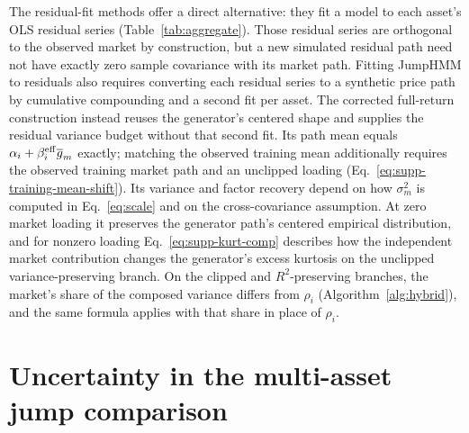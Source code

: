 The residual-fit methods offer a direct alternative: they fit a model
to each asset's OLS residual series (Table~\ref{tab:aggregate}). Those
residual series are orthogonal to the observed market by
construction, but a new simulated residual path need not have exactly
zero sample covariance with its market path. Fitting JumpHMM to
residuals also requires converting each residual series to a
synthetic price path by cumulative compounding and a second fit per
asset. The corrected full-return construction instead reuses the
generator's centered shape and supplies the residual variance budget
without that second fit. Its path mean equals
$\alpha_i+\beta_i^{\mathrm{eff}}\overline{g}_m$ exactly; matching the observed
training mean additionally requires the observed training market path
and an unclipped loading (Eq.~\eqref{eq:supp-training-mean-shift}).
Its variance and factor recovery depend on how $\sigma_m^2$ is
computed in Eq.~\eqref{eq:scale} and on the cross-covariance
assumption. At zero market loading it preserves the generator path's
centered empirical distribution, and for nonzero loading
Eq.~\eqref{eq:supp-kurt-comp} describes how the independent market
contribution changes the generator's excess kurtosis on the unclipped
variance-preserving branch. On the clipped and $R^2$-preserving
branches, the market's share of the composed variance differs from
$\rho_i$ (Algorithm~\ref{alg:hybrid}), and the same formula applies
with that share in place of $\rho_i$.

\begin{table}[H]
\centering
\caption{\textbf{Simulation check of the kurtosis composition rule.}
    For each variance share $\rho_i$, $200$ pairs of independent
    in-sample-length generator paths were standardized and combined
    as $\sqrt{\rho_i}\, x + \sqrt{1 - \rho_i}\, y$. The predicted
    column evaluates Eq.~\eqref{eq:supp-kurt-comp} with each pair's
    sample excess kurtosis; the simulated column is the sample excess
    kurtosis of the combined series. Both are averaged over the $200$
    pairs.}
\label{tab:supp-kurt-composition}
\small

\end{table}


\section{Uncertainty in the multi-asset jump comparison}
\label{sec:supp-jump-composition}

